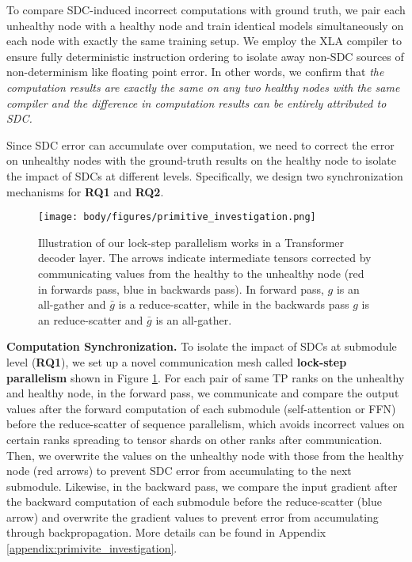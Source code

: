 To compare SDC-induced incorrect computations with ground truth, we pair each unhealthy node with a healthy node and train identical models simultaneously on each node with exactly the same 
training setup. 
We employ the XLA compiler \cite{xlapaper} to ensure fully deterministic instruction ordering to isolate away non-SDC sources of non-determinism like floating point error. 
In other words, we confirm that \emph{the computation results are exactly the same on any two healthy nodes with the same compiler and the difference in computation results can be entirely attributed to SDC.}

Since SDC error can accumulate over computation, we need to correct the error on unhealthy nodes with the ground-truth results on the healthy node to isolate the impact of SDCs at different levels. Specifically, we design two synchronization mechanisms for \textbf{RQ1} and \textbf{RQ2}.

\begin{figure}[t]
    \centering
    \texttt{[image: body/figures/primitive\_investigation.png]}
    \vskip -0.05in
    \caption{Illustration of our lock-step parallelism works in a Transformer decoder layer. The arrows indicate intermediate tensors corrected by communicating values from the healthy to the unhealthy node (red in forwards pass, blue in backwards pass). In forward pass, $g$ is an all-gather and $\bar{g}$ is a reduce-scatter, while in the backwards pass $g$ is an reduce-scatter and $\bar{g}$ is an all-gather.}
    \vskip -0.2in
    \label{fig:primitive_investigation}
\end{figure}

\textbf{Computation Synchronization.}  To isolate the impact of SDCs at submodule level (\textbf{RQ1}), we set up a novel communication mesh called \textbf{lock-step parallelism} shown in Figure \ref{fig:primitive_investigation}. 
For each pair of same TP ranks on the unhealthy and healthy node, in the forward pass, we communicate and compare the output values after the forward computation of each submodule (self-attention or FFN) before the reduce-scatter of sequence parallelism, which avoids incorrect values on certain ranks spreading to tensor shards on other ranks after communication. Then, we overwrite the values on the unhealthy node with those from the healthy node (red arrows) to prevent SDC error from accumulating to the next submodule. Likewise, in the backward pass, we compare the input gradient after the backward computation of each submodule before the reduce-scatter (blue arrow) and overwrite the gradient values to prevent error from accumulating through backpropagation. More details can be found in Appendix \ref{appendix:primivite_investigation}.

